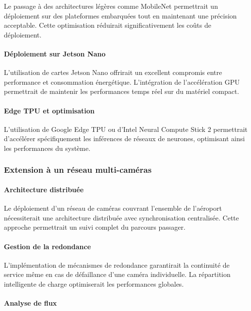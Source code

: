 \documentclass[12pt,a4paper]{article}
\begin{document}
Le passage à des architectures légères comme MobileNet permettrait un déploiement sur des plateformes embarquées tout en maintenant une précision acceptable. Cette optimisation réduirait significativement les coûts de déploiement.

\paragraph{Déploiement sur Jetson Nano}

L'utilisation de cartes Jetson Nano offrirait un excellent compromis entre performance et consommation énergétique. L'intégration de l'accélération GPU permettrait de maintenir les performances temps réel sur du matériel compact.

\paragraph{Edge TPU et optimisation}

L'utilisation de Google Edge TPU ou d'Intel Neural Compute Stick 2 permettrait d'accélérer spécifiquement les inférences de réseaux de neurones, optimisant ainsi les performances du système.

\subsubsection{Extension à un réseau multi-caméras}

\paragraph{Architecture distribuée}

Le déploiement d'un réseau de caméras couvrant l'ensemble de l'aéroport nécessiterait une architecture distribuée avec synchronisation centralisée. Cette approche permettrait un suivi complet du parcours passager.

\paragraph{Gestion de la redondance}

L'implémentation de mécanismes de redondance garantirait la continuité de service même en cas de défaillance d'une caméra individuelle. La répartition intelligente de charge optimiserait les performances globales.

\paragraph{Analyse de flux}
\end{document}
